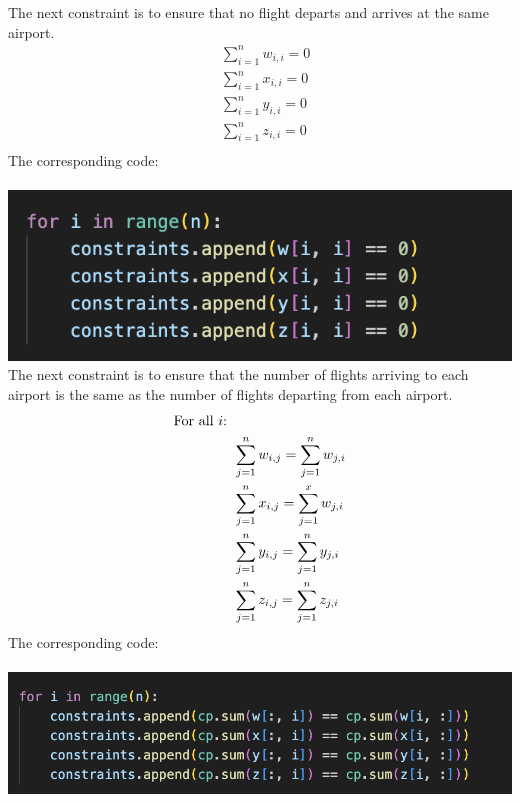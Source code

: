 \documentclass[12pt]{extarticle}
\begin{document}
The next constraint is to ensure that no flight departs and arrives at the same airport.
\begin{align*}
&\sum_{i=1}^nw_{i,i} = 0 \\
&\sum_{i=1}^nx_{i,i} = 0 \\
&\sum_{i=1}^ny_{i,i} = 0 \\
&\sum_{i=1}^nz_{i,i} = 0 \\
\end{align*}
The corresponding code: \\ \\
\includegraphics{images/constraints2.png} \\

The next constraint is to ensure that the number of flights arriving to each airport is the same as the number of flights departing from each airport.
\begin{align*}
&\text{For all } i \text{:} \\
&\hspace{1.5cm}\sum_{j=1}^nw_{i,j} = \sum_{j=1}^nw_{j,i} \\
&\hspace{1.5cm}\sum_{j=1}^nx_{i,j} = \sum_{j=1}^xw_{j,i} \\
&\hspace{1.5cm}\sum_{j=1}^ny_{i,j} = \sum_{j=1}^ny_{j,i} \\
&\hspace{1.5cm}\sum_{j=1}^nz_{i,j} = \sum_{j=1}^nz_{j,i} \\
\end{align*}
The corresponding code: \\ \\
\includegraphics{images/constraints3.png} \\
\end{document}
